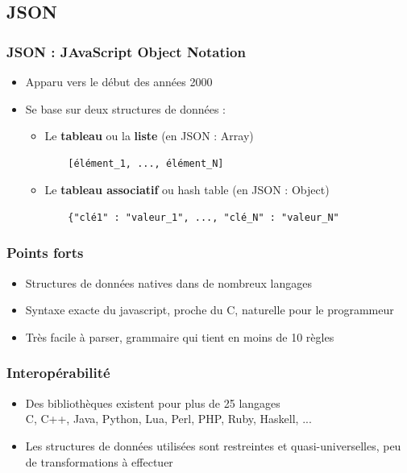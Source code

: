\documentclass{beamer}
\begin{document}
    \subsection{JSON}
        \begin{frame}[containsverbatim]
            \frametitle{JSON : JAvaScript Object Notation}
            \begin{itemize}
                \item Apparu vers le début des années 2000
                \item Se base sur deux structures de données :
                    \begin{itemize}
                        \item Le {\bf tableau} ou la {\bf liste} (en JSON : Array)\\
                        \begin{verbatim}
    [élément_1, ..., élément_N]
                        \end{verbatim}
                        \item Le {\bf tableau associatif} ou hash table (en JSON : Object) \\
                        \begin{verbatim}
    {"clé1" : "valeur_1", ..., "clé_N" : "valeur_N"
                        \end{verbatim}
                    \end{itemize}
                
            \end{itemize}
        \end{frame}

        \begin{frame}
            \frametitle{Points forts}
            \begin{itemize}
                \item Structures de données natives dans de nombreux langages\pause
                \item Syntaxe exacte du javascript, proche du C, \og naturelle \fg pour le programmeur\pause
                \item Très facile à parser, grammaire qui tient en moins de 10 règles
            \end{itemize}
        \end{frame}

        \begin{frame}
            \frametitle{Interopérabilité}
            \begin{itemize}
                \item Des bibliothèques existent pour plus de 25 langages \\
                \small C, C++, Java, Python, Lua, Perl, PHP, Ruby, Haskell, ...
                \pause
                \item \normalsize Les structures de données utilisées sont restreintes et quasi-universelles, peu de transformations à effectuer
            \end{itemize}
        \end{frame}
\end{document}
